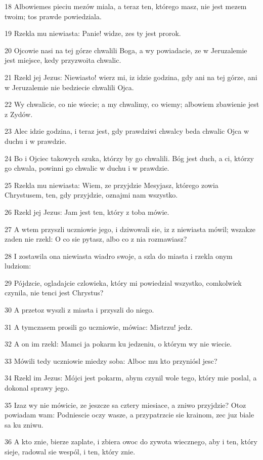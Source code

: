\par 18 Albowiemes pieciu mezów miala, a teraz ten, którego masz, nie jest mezem twoim; tos prawde powiedziala.
\par 19 Rzekla mu niewiasta: Panie! widze, zes ty jest prorok.
\par 20 Ojcowie nasi na tej górze chwalili Boga, a wy powiadacie, ze w Jeruzalemie jest miejsce, kedy przyzwoita chwalic.
\par 21 Rzekl jej Jezus: Niewiasto! wierz mi, iz idzie godzina, gdy ani na tej górze, ani w Jeruzalemie nie bedziecie chwalili Ojca.
\par 22 Wy chwalicie, co nie wiecie; a my chwalimy, co wiemy; albowiem zbawienie jest z Zydów.
\par 23 Alec idzie godzina, i teraz jest, gdy prawdziwi chwalcy beda chwalic Ojca w duchu i w prawdzie.
\par 24 Bo i Ojciec takowych szuka, którzy by go chwalili. Bóg jest duch, a ci, którzy go chwala, powinni go chwalic w duchu i w prawdzie.
\par 25 Rzekla mu niewiasta: Wiem, ze przyjdzie Mesyjasz, którego zowia Chrystusem, ten, gdy przyjdzie, oznajmi nam wszystko.
\par 26 Rzekl jej Jezus: Jam jest ten, który z toba mówie.
\par 27 A wtem przyszli uczniowie jego, i dziwowali sie, iz z niewiasta mówil; wszakze zaden nie rzekl: O co sie pytasz, albo co z nia rozmawiasz?
\par 28 I zostawila ona niewiasta wiadro swoje, a szla do miasta i rzekla onym ludziom:
\par 29 Pójdzcie, ogladajcie czlowieka, który mi powiedzial wszystko, comkolwiek czynila, nie tenci jest Chrystus?
\par 30 A przetoz wyszli z miasta i przyszli do niego.
\par 31 A tymczasem prosili go uczniowie, mówiac: Mistrzu! jedz.
\par 32 A on im rzekl: Mamci ja pokarm ku jedzeniu, o którym wy nie wiecie.
\par 33 Mówili tedy uczniowie miedzy soba: Alboc mu kto przyniósl jesc?
\par 34 Rzekl im Jezus: Mójci jest pokarm, abym czynil wole tego, który mie poslal, a dokonal sprawy jego.
\par 35 Izaz wy nie mówicie, ze jeszcze sa cztery miesiace, a zniwo przyjdzie? Otoz powiadam wam: Podniescie oczy wasze, a przypatrzcie sie krainom, zec juz biale sa ku zniwu.
\par 36 A kto znie, bierze zaplate, i zbiera owoc do zywota wiecznego, aby i ten, który sieje, radowal sie wespól, i ten, który znie.
